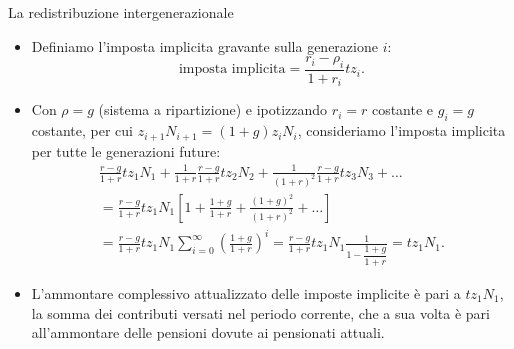\documentclass[aspectratio=64,12pt]{beamer}
\begin{document}
\begin{frame}{La redistribuzione intergenerazionale}
\begin{resize}{.9}
\begin{itemize}
\item Definiamo l'\alert{imposta implicita} gravante sulla generazione $i$:
\begin{equation*}
\text{imposta implicita} = \frac{r_i-\rho_i}{1+r_i}tz_i.
\end{equation*}

\item Con $\rho=g$ (sistema a ripartizione) e ipotizzando $r_i=r$ costante e
$g_i=g$ costante, per cui $z_{i+1}N_{i+1}=(1+g)z_iN_i$, consideriamo
l'imposta implicita per tutte le generazioni future:
\begin{multline*}
 \frac{r-g}{1+r}tz_1N_1+\frac{1}{1+r}\frac{r-g}{1+r}tz_2N_2+\frac{1}{(1+r)^2}\frac{r-g}{1+r}tz_3N_3+\dots\\
=\frac{r-g}{1+r}tz_1N_1\left[ 1+ \frac{1+g}{1+r} + \frac{(1+g)^2}{(1+r)^2} + \dots \right]\\
=\frac{r-g}{1+r}tz_1N_1\sum_{i=0}^\infty\left(\frac{1+g}{1+r}\right)^i
=\frac{r-g}{1+r}tz_1N_1\frac{1}{1-\dfrac{1+g}{1+r}} =tz_1N_1.
\end{multline*}
\item L'ammontare complessivo attualizzato delle imposte implicite è pari a
$tz_1N_1$, la somma dei contributi versati nel periodo corrente, che a sua
volta è pari all'ammontare delle pensioni dovute ai pensionati attuali.
\end{itemize}
\end{resize}
\end{frame}
\end{document}
